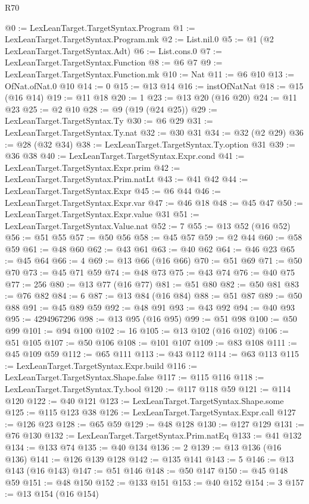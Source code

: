 \begin{lexlean}{R70}
\begin{coremodule}
@0 := LexLeanTarget.TargetSyntax.Program
@1 := LexLeanTarget.TargetSyntax.Program.mk
@2 := List.nil.{0}
@5 := @1 (@2 LexLeanTarget.TargetSyntax.Adt)
@6 := List.cons.{0}
@7 := LexLeanTarget.TargetSyntax.Function
@8 := @6 @7
@9 := LexLeanTarget.TargetSyntax.Function.mk
@10 := Nat
@11 := @6 @10
@13 := OfNat.ofNat.{0} @10
@14 := 0
@15 := @13 @14
@16 := instOfNatNat
@18 := @15 (@16 @14)
@19 := @11 @18
@20 := 1
@23 := @13 @20 (@16 @20)
@24 := @11 @23
@25 := @2 @10
@28 := @9 (@19 (@24 @25))
@29 := LexLeanTarget.TargetSyntax.Ty
@30 := @6 @29
@31 := LexLeanTarget.TargetSyntax.Ty.nat
@32 := @30 @31
@34 := @32 (@2 @29)
@36 := @28 (@32 @34)
@38 := LexLeanTarget.TargetSyntax.Ty.option @31
@39 := @36 @38
@40 := LexLeanTarget.TargetSyntax.Expr.cond
@41 := LexLeanTarget.TargetSyntax.Expr.prim
@42 := LexLeanTarget.TargetSyntax.Prim.natLt
@43 := @41 @42
@44 := LexLeanTarget.TargetSyntax.Expr
@45 := @6 @44
@46 := LexLeanTarget.TargetSyntax.Expr.var
@47 := @46 @18
@48 := @45 @47
@50 := LexLeanTarget.TargetSyntax.Expr.value @31
@51 := LexLeanTarget.TargetSyntax.Value.nat
@52 := 7
@55 := @13 @52 (@16 @52)
@56 := @51 @55
@57 := @50 @56
@58 := @45 @57
@59 := @2 @44
@60 := @58 @59
@61 := @48 @60
@62 := @43 @61
@63 := @40 @62
@64 := @46 @23
@65 := @45 @64
@66 := 4
@69 := @13 @66 (@16 @66)
@70 := @51 @69
@71 := @50 @70
@73 := @45 @71 @59
@74 := @48 @73
@75 := @43 @74
@76 := @40 @75
@77 := 256
@80 := @13 @77 (@16 @77)
@81 := @51 @80
@82 := @50 @81
@83 := @76 @82
@84 := 6
@87 := @13 @84 (@16 @84)
@88 := @51 @87
@89 := @50 @88
@91 := @45 @89 @59
@92 := @48 @91
@93 := @43 @92
@94 := @40 @93
@95 := 4294967296
@98 := @13 @95 (@16 @95)
@99 := @51 @98
@100 := @50 @99
@101 := @94 @100
@102 := 16
@105 := @13 @102 (@16 @102)
@106 := @51 @105
@107 := @50 @106
@108 := @101 @107
@109 := @83 @108
@111 := @45 @109 @59
@112 := @65 @111
@113 := @43 @112
@114 := @63 @113
@115 := LexLeanTarget.TargetSyntax.Expr.build
@116 := LexLeanTarget.TargetSyntax.Shape.false
@117 := @115 @116
@118 := LexLeanTarget.TargetSyntax.Ty.bool
@120 := @117 @118 @59
@121 := @114 @120
@122 := @40 @121
@123 := LexLeanTarget.TargetSyntax.Shape.some
@125 := @115 @123 @38
@126 := LexLeanTarget.TargetSyntax.Expr.call
@127 := @126 @23
@128 := @65 @59
@129 := @48 @128
@130 := @127 @129
@131 := @76 @130
@132 := LexLeanTarget.TargetSyntax.Prim.natEq
@133 := @41 @132
@134 := @133 @74
@135 := @40 @134
@136 := 2
@139 := @13 @136 (@16 @136)
@141 := @126 @139 @128
@142 := @135 @141
@143 := 5
@146 := @13 @143 (@16 @143)
@147 := @51 @146
@148 := @50 @147
@150 := @45 @148 @59
@151 := @48 @150
@152 := @133 @151
@153 := @40 @152
@154 := 3
@157 := @13 @154 (@16 @154)

\end{coremodule}
\end{lexlean}
